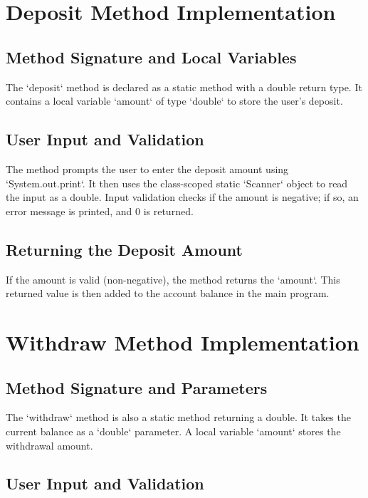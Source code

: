 \documentclass{article}
\begin{document}
\section{Deposit Method Implementation}

\subsection{Method Signature and Local Variables}

The `deposit` method is declared as a static method with a double return type. It contains a local variable `amount` of type `double` to store the user's deposit.

\subsection{User Input and Validation}

The method prompts the user to enter the deposit amount using `System.out.print`.  It then uses the class-scoped static `Scanner` object to read the input as a double.  Input validation checks if the amount is negative; if so, an error message is printed, and 0 is returned.

\subsection{Returning the Deposit Amount}

If the amount is valid (non-negative), the method returns the `amount`.  This returned value is then added to the account balance in the main program.

\section{Withdraw Method Implementation}

\subsection{Method Signature and Parameters}

The `withdraw` method is also a static method returning a double. It takes the current balance as a `double` parameter.  A local variable `amount` stores the withdrawal amount.

\subsection{User Input and Validation}
\end{document}
